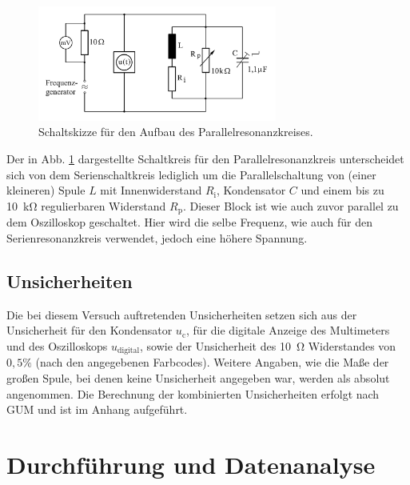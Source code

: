 			\begin{figure}[ht]
				\centering
				\includegraphics[width=0.7\textwidth]{auswertung/Parallelresonanz.PNG}
				\caption{Schaltskizze für den Aufbau des Parallelresonanzkreises.\cite{WWU}}
				\label{fig:ParallelResonanzSkizze}	
			\end{figure}
			
			Der in Abb. \ref{fig:ParallelResonanzSkizze} dargestellte Schaltkreis für den Parallelresonanzkreis unterscheidet sich von dem Serienschaltkreis lediglich um die Parallelschaltung von (einer kleineren) Spule $L$ mit Innenwiderstand $R_\text{i}$, Kondensator $C$ und einem bis zu \SI{10}{\kilo\ohm} regulierbaren Widerstand $R_\text{p}$. 
			Dieser Block ist wie auch zuvor parallel zu dem Oszilloskop geschaltet.
			Hier wird die selbe Frequenz, wie auch für den Serienresonanzkreis verwendet, jedoch eine höhere Spannung.

	\subsection{Unsicherheiten} 

		Die bei diesem Versuch auftretenden Unsicherheiten setzen sich aus der Unsicherheit für den Kondensator $u_\text{c}$, für die digitale Anzeige des Multimeters und des Oszilloskops $u_\text{digital}$, sowie der Unsicherheit des \SI{10}{\ohm} Widerstandes von $0,5\%$ (nach den angegebenen Farbcodes\cite{widerstand}). 
		Weitere Angaben, wie die Maße der großen Spule, bei denen keine Unsicherheit angegeben war, werden als absolut angenommen. 
		Die Berechnung der kombinierten Unsicherheiten erfolgt nach GUM und ist im Anhang aufgeführt.

\section{Durchführung und Datenanalyse}

